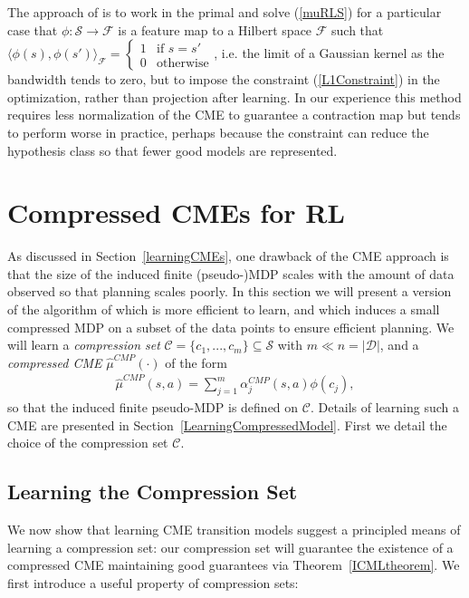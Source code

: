 \documentclass[letterpaper]{article}
\newcommand{\CsabaFLAM}{DBLP:conf/adprl/YaoSPZ14}
\newcommand{\GrunewalderEmbeddingsRL}{GrunewalderEmbeddingsMDP}
\newcommand{\cD}{{\mathcal D}}
\newcommand{\cC}{{\mathcal C}}
\newcommand{\cF}{{\mathcal F}}
\newcommand{\cS}{{\mathcal S}}
\newcommand{\lang}{\langle}
\newcommand{\rang}{\rangle}
\begin{document}
The approach of \cite{\CsabaFLAM} is to work in the primal and solve (\ref{muRLS}) for a particular case that $\phi:\cS\to\cF$ is a feature map to a Hilbert space $\cF$ such that $\lang\phi(s),\phi(s')\rang_{\cF} = \left\{ \begin{array}{ll} 1 & \mbox{if } s=s' \\ 0 & \mbox{otherwise} \end{array}\right.$, i.e. the limit of a Gaussian kernel as the bandwidth tends to zero, but to impose the constraint (\ref{L1Constraint}) in the optimization, rather than projection after learning. In our experience this method requires less normalization of the CME to guarantee a contraction map but tends to perform worse in practice, perhaps because the constraint can reduce the hypothesis class so that fewer good models are represented.

\section{Compressed CMEs for RL}  \label{Compression}

As discussed in Section~\ref{learningCMEs}, one drawback of the CME approach is that the size of the induced finite (pseudo-)MDP scales with the amount of data observed so that planning scales poorly. In this section we will present a version of the algorithm of \cite{\GrunewalderEmbeddingsRL} which is more efficient to learn, and which induces a small compressed MDP on a subset of the data points to ensure efficient planning. We will learn a \emph{compression set} $\cC = \{ c_1,...,c_m \}\subseteq \cS$  with $m\ll n = |\cD|$, and a \emph{compressed CME} $\hat\mu^{CMP}(\cdot)$ of the form
\begin{align}
\hat\mu^{CMP}(s,a) = \sum_{j=1}^m \alpha^{CMP}_j(s,a) \phi(c_j), \label{CompressedCME}
\end{align}
so that the induced finite pseudo-MDP is defined on $\cC$. Details of learning such a CME are presented in Section~\ref{LearningCompressedModel}. First we detail the choice of the compression set $\cC$.

\subsection{Learning the Compression Set} \label{learningCompression}

We now show that learning CME transition models suggest a principled means of learning a compression set: our compression set will guarantee the existence of a compressed CME maintaining good guarantees via Theorem~\ref{ICMLtheorem}. We first introduce a useful property of compression sets:
\end{document}
